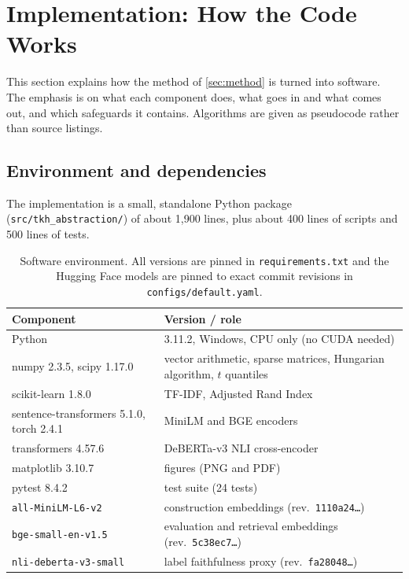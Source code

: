 \documentclass[11pt,a4paper]{article}
\newcommand{\cref}[1]{\autoref{#1}}
\theoremstyle{remark}
\newcommand{\code}[1]{\texttt{\small #1}}
\begin{document}
\section{Implementation: How the Code Works}
\label{sec:impl}

This section explains how the method of \cref{sec:method} is turned into software.
The emphasis is on what each component does, what goes in and what comes out, and which
safeguards it contains. Algorithms are given as pseudocode rather than source listings.

\subsection{Environment and dependencies}

The implementation is a small, standalone Python package (\code{src/tkh\_abstraction/}) of
about 1{,}900 lines, plus about 400 lines of scripts and 500 lines of tests.

\begin{table}[!htbp]
\centering
\caption{Software environment. All versions are pinned in \code{requirements.txt} and the
Hugging Face models are pinned to exact commit revisions in \code{configs/default.yaml}.}
\label{tab:env}
\begin{tabularx}{\linewidth}{lX}
\toprule
Component & Version / role\\
\midrule
Python & 3.11.2, Windows, CPU only (no CUDA needed)\\
numpy 2.3.5, scipy 1.17.0 \citep{virtanen2020} & vector arithmetic, sparse matrices, Hungarian algorithm, $t$ quantiles\\
scikit-learn 1.8.0 \citep{pedregosa2011} & TF-IDF, Adjusted Rand Index\\
sentence-transformers 5.1.0, torch 2.4.1 & MiniLM and BGE encoders\\
transformers 4.57.6 & DeBERTa-v3 NLI cross-encoder\\
matplotlib 3.10.7 & figures (PNG and PDF)\\
pytest 8.4.2 & test suite (24 tests)\\
\midrule
\code{all-MiniLM-L6-v2} & construction embeddings (rev.\ \code{1110a24\dots})\\
\code{bge-small-en-v1.5} & evaluation and retrieval embeddings (rev.\ \code{5c38ec7\dots})\\
\code{nli-deberta-v3-small} & label faithfulness proxy (rev.\ \code{fa28048\dots})\\
\bottomrule
\end{tabularx}
\end{table}
\end{document}

